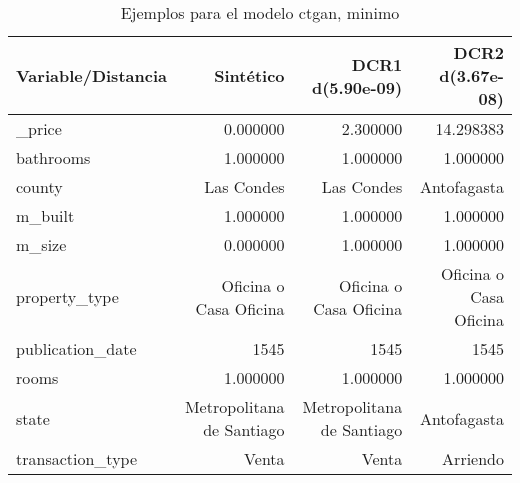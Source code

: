 \begin{table}[H]
\centering
\fontsize{10}{14}\selectfont
\caption{Ejemplos para el modelo ctgan, minimo}
\label{table-example-economicos-a-3-ctgan-min}
\begin{tabular}{|l|r|r|r|}
\hline
\rowcolor[gray]{0.8}
Variable/Distancia & Sintético & DCR1 d(5.90e-09) & DCR2 d(3.67e-08) \\
\hline \_price & \cellcolor[rgb]{0.9, 0.54, 0.52} 0.000000 & 2.300000 & 14.298383 \\
\hline bathrooms & \cellcolor[rgb]{0.9, 0.54, 0.52} 1.000000 & \cellcolor[rgb]{0.9, 0.54, 0.52} 1.000000 & \cellcolor[rgb]{0.9, 0.54, 0.52} 1.000000 \\
\hline county & \cellcolor[rgb]{0.9, 0.54, 0.52} Las Condes & \cellcolor[rgb]{0.9, 0.54, 0.52} Las Condes & Antofagasta \\
\hline m\_built & \cellcolor[rgb]{0.9, 0.54, 0.52} 1.000000 & \cellcolor[rgb]{0.9, 0.54, 0.52} 1.000000 & \cellcolor[rgb]{0.9, 0.54, 0.52} 1.000000 \\
\hline m\_size & \cellcolor[rgb]{0.9, 0.54, 0.52} 0.000000 & 1.000000 & 1.000000 \\
\hline property\_type & \cellcolor[rgb]{0.9, 0.54, 0.52} Oficina o Casa Oficina & \cellcolor[rgb]{0.9, 0.54, 0.52} Oficina o Casa Oficina & \cellcolor[rgb]{0.9, 0.54, 0.52} Oficina o Casa Oficina \\
\hline publication\_date & \cellcolor[rgb]{0.9, 0.54, 0.52} 1545 & \cellcolor[rgb]{0.9, 0.54, 0.52} 1545 & \cellcolor[rgb]{0.9, 0.54, 0.52} 1545 \\
\hline rooms & \cellcolor[rgb]{0.9, 0.54, 0.52} 1.000000 & \cellcolor[rgb]{0.9, 0.54, 0.52} 1.000000 & \cellcolor[rgb]{0.9, 0.54, 0.52} 1.000000 \\
\hline state & \cellcolor[rgb]{0.9, 0.54, 0.52} Metropolitana de Santiago & \cellcolor[rgb]{0.9, 0.54, 0.52} Metropolitana de Santiago & Antofagasta \\
\hline transaction\_type & \cellcolor[rgb]{0.9, 0.54, 0.52} Venta & \cellcolor[rgb]{0.9, 0.54, 0.52} Venta & Arriendo \\
\hline
\end{tabular}
\end{table}
